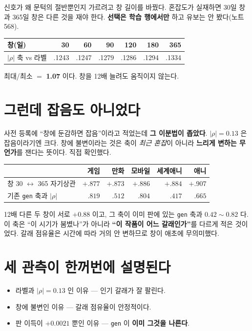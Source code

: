 \documentclass[10pt,a4paper]{article}
\begin{document}
신호가 왜 문턱의 절반뿐인지 가르려고 창 길이를 바꿨다. 혼잡도가 실재하면
30일 창과 365일 창은 다른 것을 재야 한다. \textbf{선택은 학습 행에서만} 하고
유보는 안 봤다(노트 568).

\begin{center}\small
\begin{tabular}{lrrrrrr}\toprule
창(일) & 30 & 60 & 90 & 120 & 180 & 365 \\ \midrule
$|\rho|$ 축 vs 라벨 & .1243 & .1247 & .1279 & .1286 & .1294 & .1334 \\ \bottomrule
\end{tabular}\end{center}

최대/최소 $=$ \textbf{1.07} 이다. 창을 12배 늘려도 움직이지 않는다.

\section{그런데 잡음도 아니었다}

사전 등록에 ``창에 둔감하면 잡음''이라고 적었는데 \textbf{그 이분법이 좁았다}.
$|\rho| = 0.13$ 은 잡음이라기엔 크다. 창에 불변이라는 것은 축이 \emph{최근
혼잡}이 아니라 \textbf{느리게 변하는 무언가}를 잰다는 뜻이다. 직접 확인했다.

\begin{center}\small
\begin{tabular}{lrrrrr}\toprule
& 게임 & 만화 & 모바일 & 세계애니 & 애니 \\ \midrule
창 30 $\leftrightarrow$ 365 자기상관 & $+.877$ & $+.873$ & $+.886$ & $+.884$ & $+.907$ \\
기존 \verb|gen| 축과 $|\rho|$ & $.819$ & $.512$ & $.804$ & $.417$ & $.665$ \\ \bottomrule
\end{tabular}\end{center}

12배 다른 두 창이 서로 $+0.88$ 이고, 그 축이 이미 판에 있는 \verb|gen| 축과
$0.42\sim0.82$ 다. 이 축은 ``이 시기가 붐볐나''가 아니라 \textbf{``이 작품이 어느
갈래인가''}를 다르게 적은 것이었다. 갈래 점유율은 시간에 따라 거의 안 변하므로
창이 애초에 무의미했다.

\section{세 관측이 한꺼번에 설명된다}

\begin{itemize}
\item 라벨과 $|\rho|=0.13$ 인 이유 --- 인기 갈래가 잘 팔린다.
\item 창에 불변인 이유 --- 갈래 점유율이 안정적이다.
\item 판 이득이 $+0.0021$ 뿐인 이유 --- \verb|gen| 이 \textbf{이미 그것을 나른다}.
\end{itemize}
\end{document}
